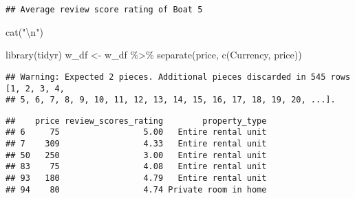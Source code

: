 \documentclass[
]{article}
\newenvironment{Shaded}{\begin{snugshade}}{\end{snugshade}}
\newcommand{\AttributeTok}[1]{\textcolor[rgb]{0.77,0.63,0.00}{#1}}
\newcommand{\FunctionTok}[1]{\textcolor[rgb]{0.00,0.00,0.00}{#1}}
\newcommand{\NormalTok}[1]{#1}
\newcommand{\OtherTok}[1]{\textcolor[rgb]{0.56,0.35,0.01}{#1}}
\newcommand{\SpecialCharTok}[1]{\textcolor[rgb]{0.00,0.00,0.00}{#1}}
\newcommand{\StringTok}[1]{\textcolor[rgb]{0.31,0.60,0.02}{#1}}
\begin{document}
\begin{verbatim}
## Average review score rating of Boat 5
\end{verbatim}

\begin{Shaded}
\begin{Highlighting}[]
\FunctionTok{cat}\NormalTok{(}\StringTok{"}\SpecialCharTok{\textbackslash{}n}\StringTok{"}\NormalTok{)}
\end{Highlighting}
\end{Shaded}

\begin{Shaded}
\begin{Highlighting}[]
\FunctionTok{library}\NormalTok{(tidyr)}
\NormalTok{w\_df }\OtherTok{\textless{}{-}}\NormalTok{ w\_df }\SpecialCharTok{\%\textgreater{}\%} \FunctionTok{separate}\NormalTok{(price, }\FunctionTok{c}\NormalTok{(}\StringTok{\textquotesingle{}Currency\textquotesingle{}}\NormalTok{, }\StringTok{\textquotesingle{}price\textquotesingle{}}\NormalTok{))}
\end{Highlighting}
\end{Shaded}

\begin{verbatim}
## Warning: Expected 2 pieces. Additional pieces discarded in 545 rows [1, 2, 3, 4,
## 5, 6, 7, 8, 9, 10, 11, 12, 13, 14, 15, 16, 17, 18, 19, 20, ...].
\end{verbatim}

\begin{Shaded}
\end{Shaded}

\begin{verbatim}
##    price review_scores_rating        property_type
## 6     75                 5.00   Entire rental unit
## 7    309                 4.33   Entire rental unit
## 50   250                 3.00   Entire rental unit
## 83    75                 4.08   Entire rental unit
## 93   180                 4.79   Entire rental unit
## 94    80                 4.74 Private room in home
\end{verbatim}
\end{document}
